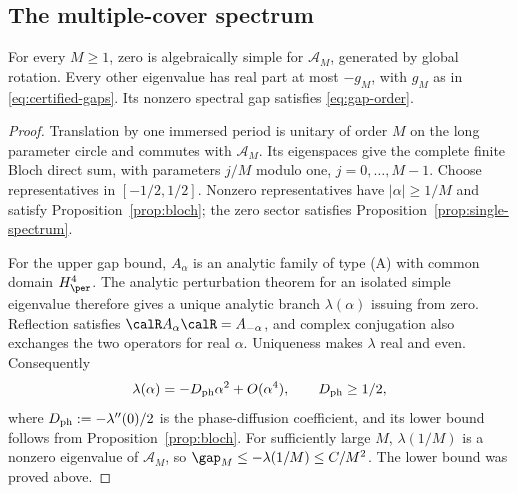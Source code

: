 \subsection{The multiple-cover spectrum}
\begin{corollary}\label{cor:multicover}
For every $M\ge1$, zero is algebraically simple for $\mathcal A_M$, generated by global rotation. Every other eigenvalue has real part at most $-g_M$, with $g_M$ as in \eqref{eq:certified-gaps}. Its nonzero spectral gap satisfies \eqref{eq:gap-order}.
\end{corollary}
\begin{proof}
Translation by one immersed period is unitary of order $M$ on the long parameter circle and commutes with $\mathcal A_M$. Its eigenspaces give the complete finite Bloch direct sum, with parameters $j/M$ modulo one, $j=0,\ldots,M-1$. Choose representatives in $[-1/2,1/2]$. Nonzero representatives have $|\alpha|\ge1/M$ and satisfy Proposition~\ref{prop:bloch}; the zero sector satisfies Proposition~\ref{prop:single-spectrum}. 

For the upper gap bound, $A_\alpha$ is an analytic family of type (A) with common domain $H^4_\per$. The analytic perturbation theorem for an isolated simple eigenvalue \cite[Chapter~VII, Section~1]{Kato} therefore gives a unique analytic branch $\lambda(\alpha)$ issuing from zero. Reflection satisfies $\calR A_\alpha\calR=A_{-\alpha}$, and complex conjugation also exchanges the two operators for real $\alpha$. Uniqueness makes $\lambda$ real and even. Consequently
\[
 \lambda(\alpha)=-D_{\rm ph}\alpha^2+O(\alpha^4),\qquad D_{\rm ph}\ge1/2,
\]
where $D_{\rm ph}:=-\lambda''(0)/2$ is the phase-diffusion coefficient, and its lower bound follows from Proposition~\ref{prop:bloch}. For sufficiently large $M$, $\lambda(1/M)$ is a nonzero eigenvalue of $\mathcal A_M$, so $\gap_M\le-\lambda(1/M)\le C/M^2$. The lower bound was proved above.
\end{proof}
